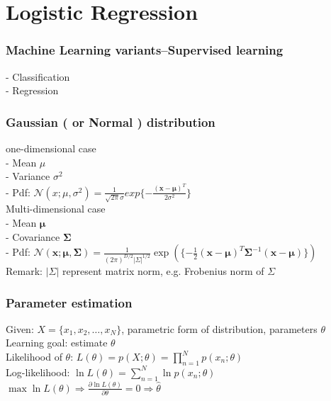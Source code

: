 \documentclass{article}
\begin{document}
	\section{Logistic Regression}


		\subsubsection*{Machine Learning variants--Supervised learning}
			- Classification\\
            - Regression

		\subsubsection*{Gaussian ( or Normal ) distribution}
			one-dimensional case\\
			- Mean $\mu$\\
			- Variance $\sigma^{2}$\\
			- Pdf: $\mathcal{N}(x;\mu,\sigma^{2})=\frac{1}{\sqrt{2\pi}\sigma} exp\{-\frac{(\bm x-\bm \mu)^{T}}{2\sigma^{2}}\}​$\\

			\noindent Multi-dimensional case\\
			- Mean $\bm \mu$\\
			- Covariance $\bm \Sigma$\\
			- Pdf: $\mathcal{N}(\bm x;\bm \mu,\bm \Sigma)=\frac{1}{(2\pi)^{D/2} |\Sigma|^{1/2}}\exp(\{-\frac{1}{2}(\bm x-\bm\mu)^{T}\bm\Sigma^{-1}(\bm x-\bm \mu)\})$\\
			Remark: $|\Sigma|​$ represent matrix norm, e.g. Frobenius norm of $\Sigma$

		\subsubsection*{Parameter estimation}
			Given: $X=\{x_{1}, x_{2},\dots,x_{N}\}$, parametric form of distribution, parameters $\theta$\\
			Learning goal: estimate $\theta$\\
			Likelihood of $\theta$: $L(\theta)=p(X;\theta)=\prod_{n=1}^{N}p(x_{n};\theta)$\\
			Log-likelihood: $\ln L(\theta)=\sum_{n=1}^{N}\ln p(x_{n};\theta)$\\
			$\max \ln L(\theta) \Rightarrow \frac{\partial \ln L(\theta)}{\partial\theta}=0 \Rightarrow \hat{\theta}$
\end{document}
